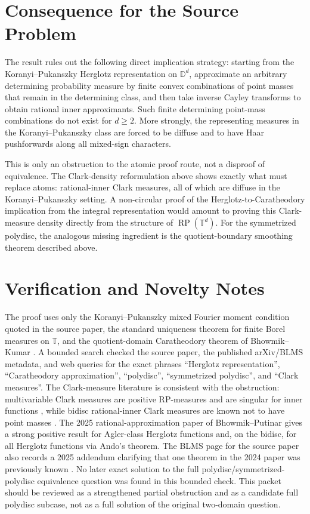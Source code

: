 \documentclass[11pt]{article}
\newcommand{\D}{\mathbb D}
\newcommand{\T}{\mathbb T}
\newcommand{\RP}{\operatorname{RP}}
\begin{document}
\section*{Consequence for the Source Problem}

The result rules out the following direct implication strategy:
starting from the Koranyi--Pukanszky Herglotz representation on \(\D^d\),
approximate an arbitrary determining probability measure by finite convex
combinations of point masses that remain in the determining class, and
then take inverse Cayley transforms to obtain rational inner approximants.
Such finite determining point-mass combinations do not exist for
\(d\geq2\).  More strongly, the representing measures in the
Koranyi--Pukanszky class are forced to be diffuse and to have Haar
pushforwards along all mixed-sign characters.

This is only an obstruction to the atomic proof route, not a disproof of
equivalence.  The Clark-density reformulation above shows exactly what
must replace atoms: rational-inner Clark measures, all of which are
diffuse in the Koranyi--Pukanszky setting.  A non-circular proof of the
Herglotz-to-Caratheodory implication from the integral representation
would amount to proving this Clark-measure density directly from the
structure of \(\RP(\T^d)\).  For the symmetrized polydisc, the analogous
missing ingredient is the quotient-boundary smoothing theorem described
above.

\section*{Verification and Novelty Notes}

The proof uses only the Koranyi--Pukanszky mixed Fourier moment condition
quoted in the source paper, the standard uniqueness theorem for finite
Borel measures on \(\T\), and the quotient-domain Caratheodory theorem of
Bhowmik--Kumar \cite{BKquot}.  A bounded search checked the source paper,
the published arXiv/BLMS metadata, and web queries for the exact phrases
``Herglotz representation'', ``Caratheodory approximation'', ``polydisc'',
``symmetrized polydisc'', and ``Clark measures''.  The Clark-measure
literature is consistent with the obstruction: multivariable Clark measures
are positive RP-measures and are singular for inner functions
\cite{Jacobsson}, while bidisc rational-inner Clark measures are known not
to have point masses \cite{BCS}.  The 2025 rational-approximation paper of
Bhowmik--Putinar \cite{BP} gives a strong positive result for Agler-class
Herglotz functions and, on the bidisc, for all Herglotz functions via
Ando's theorem.  The BLMS page for the source paper also records a 2025
addendum clarifying that one theorem in the 2024 paper was previously
known \cite{BBKadd}.  No later exact solution to the full
polydisc/symmetrized-polydisc equivalence question was found in this
bounded check.  This packet should be reviewed as a strengthened partial
obstruction and as a candidate full polydisc subcase, not as a full
solution of the original two-domain question.
\end{document}
